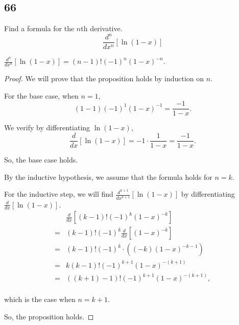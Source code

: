 \documentclass[../hw8]{subfiles}
\begin{document}
\subsection*{66}
Find a formula for the $n$th derivative.
\[\frac{d^n}{dx^n}[\ln{(1-x)}]\]

\begin{proposition}
    $\frac{d^n}{dx^n}[\ln{(1-x)}] = (n-1)!{(-1)}^n{(1-x)}^{-n}$.
\end{proposition}

\begin{proof}
    We will prove that the proposition holds by induction on $n$.

    For the base case, when $n=1$,
    \[(1-1){(-1)}^1{(1-x)}^{-1}=\frac{-1}{1-x}.\]

    We verify by differentiating $\ln{(1-x)}$,
    \[\frac{d}{dx}[\ln{(1-x)}]=-1\cdot\frac{1}{1-x}=\frac{-1}{1-x}.\]

    So, the base case holds.

    By the inductive hypothesis, we assume that the formula holds for $n=k$.

    For the inductive step, we will find $\frac{d^{k+1}}{dx^{k+1}}[\ln{(1-x)}]$ by differentiating $\frac{d}{dx}[\ln{(1-x)}]$.
    \begin{align*}
        & \frac{d}{dx} \left[ (k-1)!{(-1)}^k{(1-x)}^{-k} \right] \\
        =& (k-1)!{(-1)}^k\frac{d}{dx} \left[ {(1-x)}^{-k} \right] \\
        =& (k-1)!{(-1)}^k\cdot\left( (-k){(1-x)}^{-k-1} \right) \\
        =& k(k-1)!{(-1)}^{k+1}{(1-x)}^{-(k+1)} \\
        =& \left( (k+1)-1 \right)!{(-1)}^{k+1}{(1-x)}^{-(k+1)}, \\
    \end{align*}

    which is the case when $n=k+1$.

    So, the proposition holds.
    
\end{proof}
\end{document}

